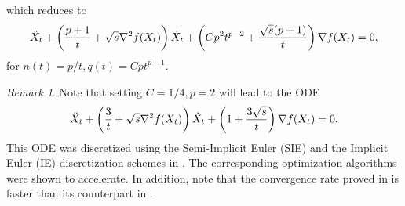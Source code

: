 \documentclass{article}
\theoremstyle{plain}
\theoremstyle{definition}
\theoremstyle{remark}
\newtheorem{remark}{Remark}[theorem]
\begin{document}
which reduces to
\begin{align}\label{HR_cnts_general_npq_p}
     \Ddot{X}_t + \left(\frac{p+1}{t}+\sqrt{s}\nabla^2 f(X_t)\right)\dot{X}_t+\left(Cp^2t^{p-2}+\frac{\sqrt{s}(p+1)}{t}\right)\nabla f(X_t)=0,
\end{align}
for \(n(t)=p/t,q(t)=Cpt^{p-1}\). 
\begin{remark}
    Note that setting \(C=1/4,p=2\) will lead to the ODE 
\begin{align}\label{HR_cnts_general_stable_ODE}
     \Ddot{X}_t + \left(\frac{3}{t}+\sqrt{s}\nabla^2 f(X_t)\right)\dot{X}_t+\left(1+\frac{3\sqrt{s}}{t}\right)\nabla f(X_t)=0.
\end{align}
 This ODE was discretized  using the Semi-Implicit Euler (SIE) and the Implicit Euler (IE) discretization schemes in \citep{shi2019acceleration}. The corresponding optimization algorithms were shown to accelerate. In addition, note that the convergence rate proved in  is faster than its counterpart in .
\end{remark}
\end{document}

